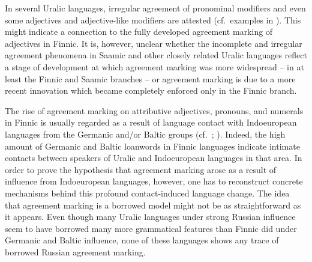 {In several Uralic languages, irregular agreement of pronominal modifiers and even some adjectives and adjective-like modifiers are attested (cf.~examples in \citealt{honti1997}). This might indicate a connection to the fully developed agreement marking of adjectives in Finnic. It is, however, unclear whether the incomplete and irregular agreement phenomena in Saamic and other closely related Uralic languages reflect a stage of development at which agreement marking was more widespread – in at least the Finnic and Saamic branches – or agreement marking is due to a more recent innovation which became completely enforced only in the Finnic branch. 

The rise of agreement marking on attributive adjectives, pronouns, and numerals in Finnic is usually regarded as a result of language contact with Indoeuropean languages from the Germanic and/or Baltic groups (cf.~\citealt[25]{tauli1955}; \citealt{hajdu1996}). Indeed, the high amount of Germanic and Baltic loanwords in Finnic languages indicate intimate contacts between speakers of Uralic and Indoeuropean languages in that area. In order to prove the hypothesis that agreement marking arose as a result of influence from Indoeuropean languages, however, one has to reconstruct  concrete mechanisms behind this profound contact-induced language change. The idea that agreement marking is a borrowed model might not be as straightforward as it appears. Even though many Uralic languages under strong Russian influence seem to have borrowed many more grammatical features than Finnic did under Germanic and Baltic influence, none of these languages shows any trace of borrowed Russian agreement marking.

}
